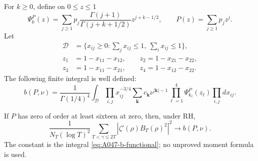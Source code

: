 For \(k\ge0\), define on \(0\le z\le1\)
\begin{equation}\label{eq:A047-vertex}
 \Psi_k^P(z)=
   \sum_{j\ge1}p_j
             \frac{\Gamma(j+1)}{\Gamma(j+k+1/2)}
                                      z^{j+k-1/2},
       \qquad P(z)=\sum_{j\ge1}p_jz^j .
\end{equation}
Let
\begin{align*}
 \mathcal D&=\{x_{ij}\ge0:
                   \textstyle\sum_jx_{ij}\le1,\
                   \sum_ix_{ij}\le1\},\\
 z_1&=1-x_{11}-x_{12},\qquad z_2=1-x_{21}-x_{22},\\
 z_3&=1-x_{11}-x_{21},\qquad z_4=1-x_{12}-x_{22}.
\end{align*}
The following finite integral is well defined:
\begin{equation}\label{eq:A047-b-functional}
 b(P,\nu)=\frac1{\Gamma(1/4)^4}
 \int_{\mathcal D}\prod_{i,j}x_{ij}^{-3/4}
 \sum_{\mathbf k}c_{\mathbf k}\nu^{|\mathbf k|-1}
                       \prod_{\ell=1}^4\Psi_{k_\ell}^P(z_\ell)
                                      \prod_{i,j}dx_{ij}.
\end{equation}

\begin{lemma}
\label{lem:A047-second}
If \(P\) has zero of order at least sixteen at zero, then,
under RH,
\begin{equation}\label{eq:A047-second-constant}
 \frac1{N_T(\log T)^2}
       \sum_{T<\gamma\le2T}
                    |\zeta'(\rho)B_T(\rho)^2|^2
                            \longrightarrow b(P,\nu).
\end{equation}
The constant is the integral \eqref{eq:A047-b-functional};
no unproved moment formula is used.
\end{lemma}


